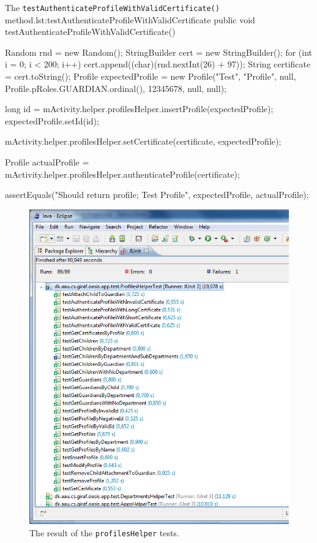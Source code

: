 \begin{Java}{The \texttt{testAuthenticateProfileWithValidCertificate()} method.}{lst:testAuthenticateProfileWithValidCertificate}
public void testAuthenticateProfileWithValidCertificate() {
	Random rnd = new Random();
	StringBuilder cert = new StringBuilder();
	for (int i = 0; i < 200; i++)
	{
		cert.append((char)(rnd.nextInt(26) + 97));
	}
	String certificate = cert.toString();
	Profile expectedProfile = new Profile("Test", "Profile", null, Profile.pRoles.GUARDIAN.ordinal(), 12345678, null, null);

	long id = mActivity.helper.profilesHelper.insertProfile(expectedProfile);
	expectedProfile.setId(id);
	
	mActivity.helper.profilesHelper.setCertificate(certificate, expectedProfile);

	Profile actualProfile = mActivity.helper.profilesHelper.authenticateProfile(certificate);

	assertEquals("Should return profile; Test Profile", expectedProfile, actualProfile);
}
\end{Java}


\begin{figure}[htbp]
	\centering
		\includegraphics[width=\textwidth]{Images/unit_testing/profile_helper_tests.PNG}
	\caption{The result of the \texttt{profilesHelper} tests.}
	\label{fig:profile_helper_tests}
\end{figure}

